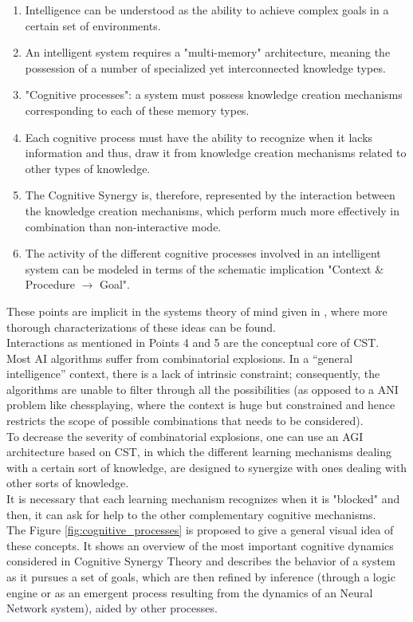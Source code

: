 \begin{enumerate}
	\item Intelligence can be understood as the ability to achieve complex goals in a certain set of environments. 
	\item An intelligent system requires a "multi-memory" architecture, meaning the possession of a number of specialized yet interconnected knowledge types.
	\item "Cognitive processes": a system must possess knowledge creation mechanisms corresponding to each of these memory types.
	\item Each cognitive process must have the ability to recognize when it lacks information and thus, draw it from knowledge creation mechanisms related to other types of knowledge.
	\item The Cognitive Synergy is, therefore, represented by the interaction between the knowledge creation mechanisms, which perform much more effectively in combination than non-interactive mode. 
	\item The activity of the different cognitive processes involved in an intelligent system can be modeled in terms of the schematic implication "Context \& Procedure $\rightarrow$ Goal".
\end{enumerate}

These points are implicit in the systems theory of mind given in \cite{goertzel2006the}, where more thorough characterizations of these ideas can be found.\\
Interactions as mentioned in Points 4 and 5 are the conceptual core of CST. \\
Most AI algorithms suffer from combinatorial explosions. In a “general intelligence” context, there is a lack of intrinsic constraint; consequently, the algorithms are unable to filter through all the possibilities (as opposed to a ANI problem like chessplaying, where the context is huge but constrained and hence restricts the scope of possible combinations that needs to be considered). \\
To decrease the severity of combinatorial explosions, one can use an AGI architecture based on CST, in which the different learning mechanisms dealing with a certain sort of knowledge, are designed to synergize with ones dealing with other sorts of knowledge. \\
It is necessary that each learning mechanism recognizes when it is "blocked" and then, it can ask for help to the other complementary cognitive mechanisms. \\
The Figure \ref{fig:cognitive_processes} is proposed to give a general visual idea of these concepts. It shows an overview of the most important cognitive dynamics considered in Cognitive Synergy Theory and describes the behavior of a system as it pursues a set of goals, which are then refined by inference (through a logic engine or as an emergent process resulting from the dynamics of an Neural Network system), aided by other processes. \\

